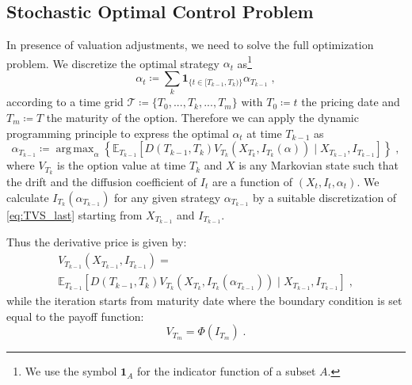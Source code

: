 \documentclass[runningheads]{m2ef}
\DeclareMathOperator*{\argmax}{arg\,max}
\begin{document}
\subsection{Stochastic Optimal Control Problem}
In presence of valuation adjustments, we need to solve the full optimization problem. We discretize the optimal strategy $\alpha_t$ as\footnote{We use the symbol $\mathbf{1}_A$ for the indicator function of a subset $A$.}
\begin{equation}
    \alpha_t \coloneqq \sum_k \mathbf{1}_{ \{t \in [T_{k-1}, T_k)\}}\alpha_{T_{k-1}} \; ,
\label{eq:piecewise_strategy}\end{equation}
according to a time grid $\mathcal{T}\coloneqq \{T_0,...,T_k,...,T_m\}$ with $T_0\coloneqq t$ the pricing date and $T_m \coloneqq T$ the maturity of the option. 
Therefore we can apply the dynamic programming principle to express the optimal $\alpha_t$ at time $T_{k-1}$ as
\begin{equation}
    \alpha_{T_{k-1}}\coloneqq \argmax_{\alpha} \left\{\mathbb{E}_{T_{k-1}}\left[D\left(T_{k-1},T_{k} \right) V_{T_{k}}\left(X_{T_{k}}, I_{T_{k}}(\alpha)\right) \mid X_{T_{k-1}}, I_{T_{k-1}}\right]\right\} \; ,
\label{eq:recursion}\end{equation}
where $V_{T_k}$ is the option value at time $T_k$ and $X$ is any Markovian state such that the drift and the diffusion coefficient of $I_t$ are a function of $\left(X_t,I_t,\alpha_t\right)$. We calculate $I_{T_k}\left(\alpha_{T_{k-1}}\right)$ for any given strategy $\alpha_{T_{k-1}}$ by a suitable discretization of \eqref{eq:TVS_last} starting from $X_{T_{k-1}}$ and $I_{T_{k-1}}$.

Thus the derivative price is given by:
\begin{equation}
\begin{aligned}
	    V_{T_{k-1}}\left(X_{T_{k-1}}, I_{T_{k-1}}\right)= \\ 
	     \mathbb{E}_{T_{k-1}}\left[D\left(T_{k-1},T_{k}\right) V_{T_{k}}\left(X_{T_{k}}, I_{T_{k}}\left(\alpha_{T_{k-1}}\right)\right) \mid X_{T_{k-1}}, I_{T_{k-1}}\right] \; ,
\end{aligned}
\label{eq:recursion2}\end{equation}
while the iteration starts from maturity date where the boundary condition is set equal to the payoff function:
\begin{equation}
    V_{T_m} = \Phi\left(I_{T_m}\right) \; .
\end{equation}
\end{document}
